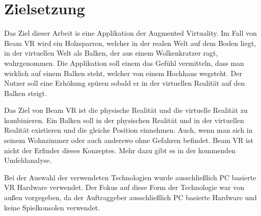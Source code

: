 \section{Zielsetzung}
\label{sec: objective}

Das Ziel dieser Arbeit is eine Applikation der Augmented Virtuality.
Im Fall von Beam VR wird ein Holzsparren, welcher in der realen Welt auf dem Boden liegt, in der virtuellen Welt als Balken, der aus einem Wolkenkratzer ragt, wahrgenommen.
Die Applikation soll einem das Gefühl vermitteln, dass man wirklich auf einem Balken steht, welcher von einem Hochhaus wegsteht.
Der Nutzer soll eine Erhöhung spüren sobald er in der virtuellen Realität auf den Balken steigt.

Das Ziel von Beam VR ist die physische Realität und die virtuelle Realität zu kombinieren.
Ein Balken soll in der physischen Realität und in der virtuellen Realität existieren und die gleiche Position einnehmen.
Auch, wenn man sich in seinem Wohnzimmer oder auch anderswo ohne Gefahren befindet.
Beam VR ist nicht der Erfinder dieses Konzeptes.
Mehr dazu gibt es in der kommenden Umfeldanalyse.

Bei der Auswahl der verwendeten Technologien wurde ausschließlich PC basierte VR Hardware verwendet.
Der Fokus auf diese Form der Technologie war von außen vorgegeben, da der Auftraggeber ausschließlich PC basierte Hardware und keine Spielkonsolen verwendet.
